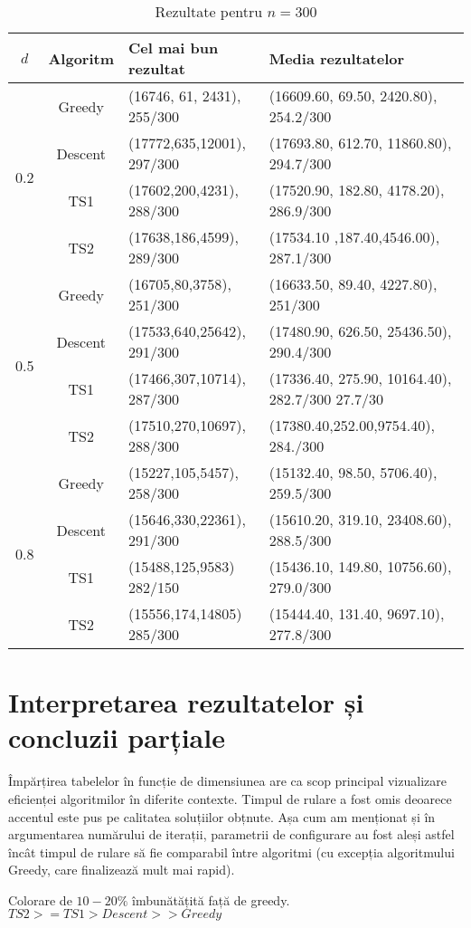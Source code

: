 \begin{table}[H]
\centering
\caption{Rezultate pentru $n = 300$}
\begin{tabular}{ccll}
\toprule
$d$ & Algoritm & Cel mai bun rezultat  & Media rezultatelor \\
\midrule
\multirow{4}{*}{0.2}
  & Greedy  & (16746, 61, 2431), 255/300 & (16609.60, 69.50, 2420.80), 254.2/300 \\
  & Descent & (17772,635,12001), 297/300   & (17693.80, 612.70, 11860.80), 294.7/300 \\
  & TS1     & (17602,200,4231), 288/300    & (17520.90, 182.80, 4178.20), 286.9/300 \\
  & TS2     & (17638,186,4599), 289/300    & (17534.10 ,187.40,4546.00), 287.1/300 \\
\midrule
\multirow{4}{*}{0.5}
  & Greedy  & (16705,80,3758), 251/300     & (16633.50, 89.40, 4227.80), 251/300 \\
  & Descent & (17533,640,25642), 291/300    & (17480.90, 626.50, 25436.50), 290.4/300 \\
  & TS1     & (17466,307,10714), 287/300    & (17336.40, 275.90, 10164.40), 282.7/300
  27.7/30 \\
  & TS2     & (17510,270,10697), 288/300    & (17380.40,252.00,9754.40), 284./300 \\
\midrule
\multirow{4}{*}{0.8}
  & Greedy  & (15227,105,5457), 258/300     & (15132.40, 98.50, 5706.40), 259.5/300 \\
  & Descent & (15646,330,22361), 291/300    & (15610.20, 319.10, 23408.60), 288.5/300 \\
  & TS1     & (15488,125,9583) 282/150     &  (15436.10, 149.80, 10756.60), 279.0/300 \\
  & TS2     &  (15556,174,14805) 285/300    &  (15444.40, 131.40, 9697.10), 277.8/300 \\
\bottomrule
\end{tabular}\label{tab:rezultate_n300}
\end{table}





\section{Interpretarea rezultatelor și concluzii parțiale}
  
Împărțirea tabelelor în funcție de dimensiunea are ca scop principal vizualizare eficienței algoritmilor în diferite contexte. Timpul de rulare a fost omis deoarece accentul este pus pe calitatea soluțiilor obțnute. Așa cum am menționat și în argumentarea numărului de iterații, parametrii de configurare au fost aleși astfel încât timpul de rulare să fie comparabil între algoritmi (cu excepția algoritmului Greedy, care finalizează mult mai rapid).

Colorare de $10-20\%$ îmbunătățită față de greedy.
$TS2 >= TS1 > Descent >> Greedy$

